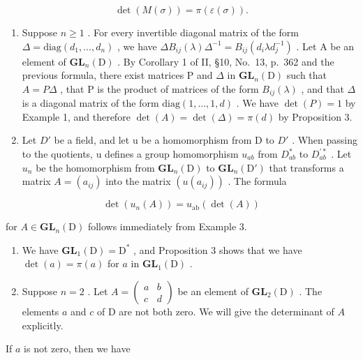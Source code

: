 \[
\det (M (\sigma)) = \pi (\varepsilon (\sigma)).\tag{22}
\]

\begin{enumerate}
\def\labelenumi{\arabic{enumi})}
\setcounter{enumi}{2}
\item
  Suppose \(n \geqslant 1\) . For every invertible diagonal matrix of the form \(\Delta = \text{diag}(d_1, \ldots, d_n)\) , we have \(\Delta B_{ij}(\lambda)\Delta^{-1} = B_{ij}(d_i\lambda d_j^{-1})\) . Let A be an element of \(\mathbf{GL}_n(\mathrm{D})\) . By Corollary 1 of II, §10, No.~13, p.~362 and the previous formula, there exist matrices P and \(\Delta\) in \(\mathbf{GL}_n(\mathrm{D})\) such that \(A = P\Delta\) , that P is the product of matrices of the form \(B_{ij}(\lambda)\) , and that \(\Delta\) is a diagonal matrix of the form \(\text{diag}(1, \ldots, 1, d)\) . We have \(\det(P) = 1\) by Example 1, and therefore \(\det(A) = \det(\Delta) = \pi(d)\) by Proposition 3.
\item
  Let \(D'\) be a field, and let u be a homomorphism from D to \(D'\) . When passing to the quotients, u defines a group homomorphism \(u_{ab}\) from \(D_{ab}^{*}\) to \(D_{ab}^{\prime *}\) . Let \(u_{n}\) be the homomorphism from \(\mathbf{GL}_{n}(\mathrm{D})\) to \(\mathbf{GL}_{n}(\mathrm{D}')\) that transforms a matrix \(A = (a_{ij})\) into the matrix \((u(a_{ij}))\) . The formula
\end{enumerate}

\[
\det (u _ {n} (A)) = u _ {\mathrm{ab}} (\det (A))\tag{23}
\]

for \(A \in \mathbf{GL}_n(\mathrm{D})\) follows immediately from Example 3.

\begin{enumerate}
\def\labelenumi{\arabic{enumi})}
\setcounter{enumi}{4}
\item
  We have \(\mathbf{GL}_1(\mathrm{D}) = \mathrm{D}^*\) , and Proposition 3 shows that we have \(\det(a) = \pi(a)\) for \(a\) in \(\mathbf{GL}_1(\mathrm{D})\) .
\item
  Suppose \(n = 2\) . Let \(A = \begin{pmatrix} a & b \\ c & d \end{pmatrix}\) be an element of \(\mathbf{GL}_2(\mathrm{D})\) . The elements \(a\) and \(c\) of \(\mathrm{D}\) are not both zero. We will give the determinant of \(A\) explicitly.
\end{enumerate}

If \(a\) is not zero, then we have

